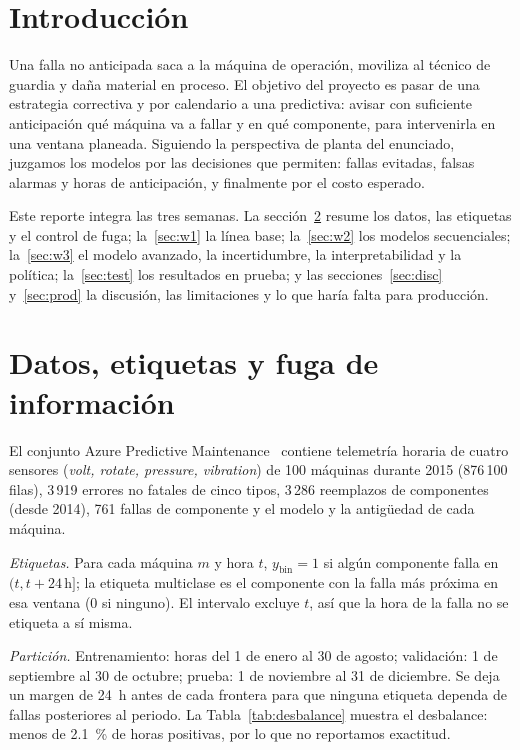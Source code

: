 \documentclass[conference,letterpaper]{IEEEtran}
\begin{document}
\section{Introducción}
Una falla no anticipada saca a la máquina de operación, moviliza al técnico de guardia y daña material en proceso. El objetivo del proyecto es pasar de una estrategia correctiva y por calendario a una predictiva: avisar con suficiente anticipación qué máquina va a fallar y en qué componente, para intervenirla en una ventana planeada. Siguiendo la perspectiva de planta del enunciado, juzgamos los modelos por las decisiones que permiten: fallas evitadas, falsas alarmas y horas de anticipación, y finalmente por el costo esperado.

Este reporte integra las tres semanas. La sección~\ref{sec:datos} resume los datos, las etiquetas y el control de fuga; la~\ref{sec:w1} la línea base; la~\ref{sec:w2} los modelos secuenciales; la~\ref{sec:w3} el modelo avanzado, la incertidumbre, la interpretabilidad y la política; la~\ref{sec:test} los resultados en prueba; y las secciones~\ref{sec:disc} y~\ref{sec:prod} la discusión, las limitaciones y lo que haría falta para producción.

\section{Datos, etiquetas y fuga de información}\label{sec:datos}
El conjunto Azure Predictive Maintenance~\cite{azure} contiene telemetría horaria de cuatro sensores (\textit{volt, rotate, pressure, vibration}) de 100 máquinas durante 2015 (876\,100 filas), 3\,919 errores no fatales de cinco tipos, 3\,286 reemplazos de componentes (desde 2014), 761 fallas de componente y el modelo y la antigüedad de cada máquina.

\textit{Etiquetas.} Para cada máquina $m$ y hora $t$, $y_{\text{bin}}=1$ si algún componente falla en $(t, t+24\,\text{h}]$; la etiqueta multiclase es el componente con la falla más próxima en esa ventana (0 si ninguno). El intervalo excluye $t$, así que la hora de la falla no se etiqueta a sí misma.

\textit{Partición.} Entrenamiento: horas del 1 de enero al 30 de agosto; validación: 1 de septiembre al 30 de octubre; prueba: 1 de noviembre al 31 de diciembre. Se deja un margen de 24~h antes de cada frontera para que ninguna etiqueta dependa de fallas posteriores al periodo. La Tabla~\ref{tab:desbalance} muestra el desbalance: menos de 2.1~\% de horas positivas, por lo que no reportamos exactitud.
\end{document}
